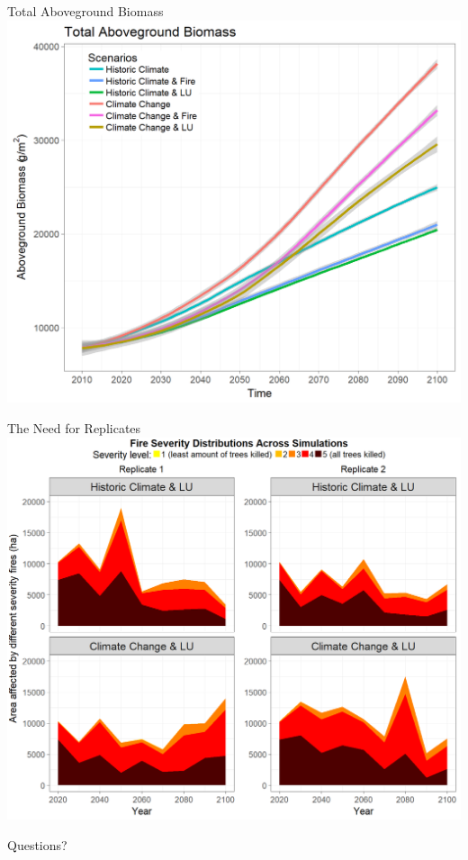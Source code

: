 \documentclass[xcolor=dvipsnames]{beamer}
\begin{document}
\begin{frame}{Total Aboveground Biomass}
\centering\includegraphics[width=.75\linewidth]{AGB_legend_fix.png}
\end{frame}

\begin{frame}{The Need for Replicates}
\centering\includegraphics[width=.725\linewidth]{firedisrealFINAL.png}

\end{frame}

\appendix
\begin{frame}[noframenumbering]
\centering\Huge{\color{FuchsiaDark} Questions?}\\[1cm]
\end{frame}
\end{document}
